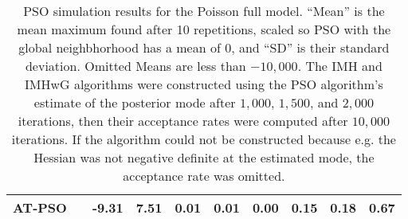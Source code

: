 \documentclass[12pt]{article}
\begin{document}
\begin{table}[h]
{\begin{tabular}{llrr|rrr|rrr}
  AT-PSO &  & -9.31 & 7.51 & 0.01 & 0.01 & 0.00 & 0.15 & 0.18 & 0.67 \\ 
   \hline
\end{tabular}
}
\label{tab:psopoisfull}
\caption{PSO simulation results for the Poisson full model. ``Mean'' is the mean maximum found after 10 repetitions, scaled so PSO with the global neighbhorhood has a mean of 0, and ``SD'' is their standard deviation. Omitted Means are less than $-10,000$. The IMH and IMHwG algorithms were constructed using the PSO algorithm's estimate of the posterior mode after $1,000$, $1,500$, and $2,000$ iterations, then their acceptance rates were computed after $10,000$ iterations. If the algorithm could not be constructed because e.g. the Hessian was not negative definite at the estimated mode, the acceptance rate was omitted.}
\end{table}
\end{document}

